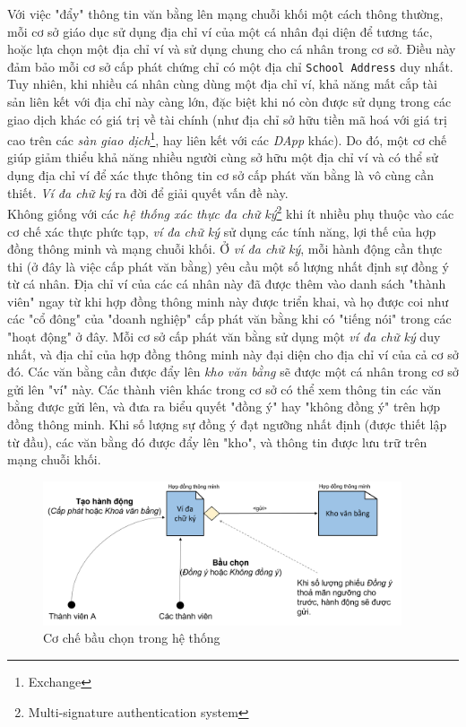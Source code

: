 Với việc "đẩy" thông tin văn bằng lên mạng chuỗi khối một cách thông thường, mỗi cơ sở giáo dục sử dụng địa chỉ ví của một cá nhân đại diện để tương tác, hoặc lựa chọn một địa chỉ ví và sử dụng chung cho cá nhân trong cơ sở. Điều này đảm bảo mỗi cơ sở cấp phát chứng chỉ có một địa chỉ \texttt{School Address} duy nhất. Tuy nhiên, khi nhiều cá nhân cùng dùng một địa chỉ ví, khả năng mất cắp tài sản liên kết với địa chỉ này càng lớn, đặc biệt khi nó còn được sử dụng trong các giao dịch khác có giá trị về tài chính (như địa chỉ sở hữu tiền mã hoá với giá trị cao trên các \textit{sàn giao dịch}\footnote{Exchange}, hay liên kết với các \textit{DApp} khác). Do đó, một cơ chế giúp giảm thiểu khả năng nhiều người cùng sở hữu một địa chỉ ví và có thể sử dụng địa chỉ ví để xác thực thông tin cơ sở cấp phát văn bằng là vô cùng cần thiết. \textit{Ví đa chữ ký} ra đời để giải quyết vấn đề này.\\

Không giống với các \textit{hệ thống xác thực đa chữ ký}\footnote{Multi-signature authentication system} khi ít nhiều phụ thuộc vào các cơ chế xác thực phức tạp, \textit{ví đa chữ ký} sử dụng các tính năng, lợi thế của hợp đồng thông minh và mạng chuỗi khối. Ở \textit{ví đa chữ ký}, mỗi hành động cần thực thi (ở đây là việc cấp phát văn bằng) yêu cầu một số lượng nhất định sự đồng ý từ cá nhân. Địa chỉ ví của các cá nhân này đã được thêm vào danh sách "thành viên" ngay từ khi hợp đồng thông minh này được triển khai, và họ được coi như các "cổ đông" của "doanh nghiệp" cấp phát văn bằng khi có "tiếng nói" trong các "hoạt động" ở đây. Mỗi cơ sở cấp phát văn bằng sử dụng một \textit{ví đa chữ ký} duy nhất, và địa chỉ của hợp đồng thông minh này đại diện cho địa chỉ ví của cả cơ sở đó. Các văn bằng cần được đẩy lên \textit{kho văn bằng} sẽ được một cá nhân trong cơ sở gửi lên "ví" này. Các thành viên khác trong cơ sở có thể xem thông tin các văn bằng được gửi lên, và đưa ra biểu quyết "đồng ý" hay "không đồng ý" trên hợp đồng thông minh. Khi số lượng sự đồng ý đạt ngưỡng nhất định (được thiết lập từ đầu), các văn bằng đó được đẩy lên "kho", và thông tin được lưu trữ trên mạng chuỗi khối.\\

\begin{figure}[!ht]
    \centering
    \includegraphics[width=400px]{anh/giai-phap/co-che-bau-chon.png}
    \caption{Cơ chế bầu chọn trong hệ thống}
\end{figure}


